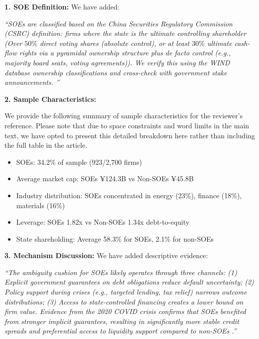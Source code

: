 \documentclass[12pt]{article}
\begin{document}
\begin{enumerate}
\begin{responsebox}
    \vspace{0.5cm}

    \textbf{1. SOE Definition:}
    We have added:

    \textit{``SOEs are classified based on the China Securities Regulatory Commission (CSRC) definition: firms where the state is the ultimate controlling shareholder (Over $50\%$ direct voting shares (absolute control), or at least $30\%$ ultimate cash-flow rights via a pyramidal ownership structure plus de facto control (e.g., majority board seats, voting agreements)). We verify this using the WIND database ownership classifications and cross-check with government stake announcements. ''}

    \vspace{0.5cm}

    \textbf{2. Sample Characteristics:}
    
    We provide the following summary of sample characteristics for the reviewer's reference. Please note that due to space constraints and word limits in the main text, we have opted to present this detailed breakdown here rather than including the full table in the article.
    \begin{itemize}
        \item SOEs: 34.2\% of sample (923/2,700 firms)
        \item Average market cap: SOEs ¥124.3B vs Non-SOEs ¥45.8B
        \item Industry distribution: SOEs concentrated in energy (23\%), finance (18\%), materials (16\%)
        \item Leverage: SOEs 1.82x vs Non-SOEs 1.34x debt-to-equity
        \item State shareholding: Average 58.3\% for SOEs, 2.1\% for non-SOEs
    \end{itemize}

    
    \vspace{0.5cm}
    
    \textbf{3. Mechanism Discussion:}
    We have added descriptive evidence:

    \textit{``The ambiguity cushion for SOEs likely operates through three channels: (1) Explicit government guarantees on debt obligations reduce default uncertainty; (2) Policy support during crises (e.g., targeted lending, tax relief) narrows outcome distributions; (3) Access to state-controlled financing creates a lower bound on firm value. Evidence from the 2020 COVID crisis confirms that SOEs benefited from stronger implicit guarantees, resulting in significantly more stable credit spreads and preferential access to liquidity support compared to non-SOEs \citep{AllianzTrade2021}.''}


\end{responsebox}
\end{enumerate}
\end{document}
